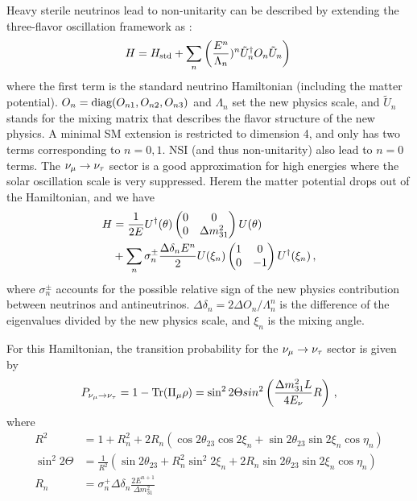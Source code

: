 \documentclass[twocolumn]{article}
\begin{document}
Heavy sterile neutrinos lead to non-unitarity can be described by extending the three-flavor oscillation framework as :
\begin{align*}
  H = H_{\text{{std}}} + \sum_n \left(\frac{E^n}{\Lambda_n})^n \tilde{U}^\dagger_n O_n \tilde{U}_n\right)
\,\end{align*}
where the first term is the standard neutrino Hamiltonian (including the matter potential). $O_n = \text{{diag}}(O_{n1}, O_{n2}, O_{n3})$ and $\Lambda_n$ set the new physics scale, and $\tilde{U}_n$ stands for the mixing matrix that describes the flavor structure of the new physics. A minimal SM extension is restricted to dimension 4, and only has two terms corresponding to $n = 0,1$. NSI (and thus non-unitarity) also lead to $n=0$ terms. 
The $\nu_\mu \to \nu_\tau$ sector is a good approximation for high energies where the solar oscillation scale is very suppressed. Herem the matter potential drops out of the Hamiltonian, and we have
\begin{align*}
  H &= \frac{1}{2E}U^\dagger(\th)\begin{pmatrix} 
                                  0 & 0 \\
                                  0 & \dm[31]
                                \end{pmatrix}
                  U(\th) \\
    &+ \sum_n \sigma^\pm_n \frac{\Delta \delta_n E^n}{2}U(\xi_n) \begin{pmatrix} 1 & 0 \\ 0 & -1 \end{pmatrix}U^\dagger(\xi_n)
\,,\end{align*}  
where $\sigma^\pm_n$ accounts for the possible relative sign of the new physics contribution between neutrinos and antineutrinos. $\Delta \delta_n = 2 \Delta O_n / \Lambda ^n_n$ is the difference of the eigenvalues divided by the new physics scale, and $\xi_n$ is the mixing angle.

For this Hamiltonian, the transition probability for the $\nu_\mu \to \nu_\tau$ sector is given by
\begin{align*}
  P_{\nmt} = 1- \t{Tr}(\Pi_\mu \rho) = \sin^2 2\Theta sin^2 \left( \frac{\dm[31]L}{4E_\nu}R \right)
\,,\end{align*}
where
\begin{align*}
  R^{2}&=1+R_{n}^{2}+2R_{n}\left(\cos 2\theta_{23}\cos 2\xi_{n}+\sin 2 \theta_{23} \sin 2\xi_{n} \cos \eta_{n}\right)\\
  \sin ^{2} 2 \Theta &= \frac{1}{R^{2}}\left(\sin 2 \theta_{23}+R_{n}^{2} \sin ^{2} 2 \xi_{n}+2 R_{n} \sin 2 \theta_{23} \sin 2 \xi_{n} \cos \eta_{n}\right) \\
  R_{n}&=\sigma_{n}^{+} \Delta \delta_{n} \frac{2 E^{n+1}}{\Delta m_{31}^{2}}
\,\end{align*}
\end{document}
